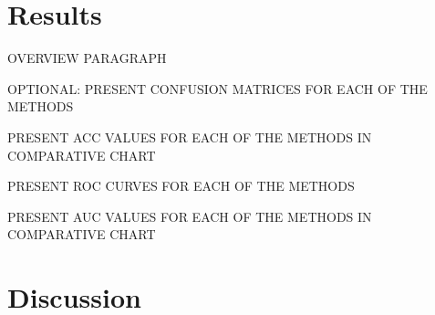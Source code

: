 \documentclass[12pt]{article}
\begin{document}
\section{Results}
\label{sec:resu}

OVERVIEW PARAGRAPH

OPTIONAL: PRESENT CONFUSION MATRICES FOR EACH OF THE METHODS

PRESENT ACC VALUES FOR EACH OF THE METHODS IN COMPARATIVE CHART

PRESENT ROC CURVES FOR EACH OF THE METHODS

PRESENT AUC VALUES FOR EACH OF THE METHODS IN COMPARATIVE CHART






\section{Discussion}
\label{sec:disc}







\end{document}
